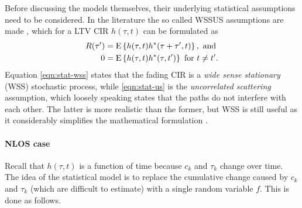 Before discussing the models themselves, their underlying statistical assumptions need to be considered. In the literature the so called WSSUS assumptions are made \cite{Messier, Gallager}, which for a LTV CIR \(h(\tau, t)\) can be formulated as
\begin{subequations}
	\begin{align}
		R(\tau') &= \operatorname{E} \left\{h(\tau, t) h^*(\tau + \tau', t)\right\}, \text{ and } \label{eqn:stat-wss} \\
		0 &= \operatorname{E} \left\{h(\tau, t) h^*(\tau, t')\right\} \text { for } t \neq t'. \label{eqn:stat-us}
	\end{align}
\end{subequations}
Equation \eqref{eqn:stat-wss} states that the fading CIR is a \emph{wide sense stationary} (WSS) stochastic process, while \eqref{eqn:stat-us} is the \emph{uncorrelated scattering} assumption, which loosely speaking states that the paths do not interfere with each other. The latter is more realistic than the former, but WSS is still useful as it considerably simplifies the mathematical formulation \cite{Messier}.

\paragraph{NLOS case}

Recall that \(h(\tau, t)\) is a function of time because \(c_k\) and \(\tau_k\) change over time. The idea of the statistical model is to replace the cumulative change caused by \(c_k\) and \(\tau_k\) (which are difficult to estimate) with a single random variable \(f\). This is done as follows.

